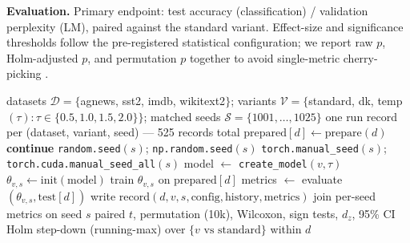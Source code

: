 \documentclass[11pt,a4paper]{article}
\begin{document}
\textbf{Evaluation.} Primary endpoint: test accuracy (classification) / validation perplexity (LM), paired against the standard variant. Effect-size and significance thresholds follow the pre-registered statistical configuration; we report raw $p$, Holm-adjusted $p$, and permutation $p$ together to avoid single-metric cherry-picking \cite{dodge2019}.

\begin{algorithm}[ht]
\caption{Seed-matched paired experimental protocol}
\label{alg:protocol}
\begin{algorithmic}[1]
\Require datasets $\mathcal{D}=\{$agnews, sst2, imdb, wikitext2$\}$; variants $\mathcal{V}=\{$standard, dk, temp$(\tau): \tau \in \{0.5,1.0,1.5,2.0\}\}$; matched seeds $\mathcal{S}=\{1001,\dots,1025\}$
\Ensure one run record per (dataset, variant, seed) --- 525 records total
  \State $\text{prepared}[d] \gets \text{prepare}(d)$ 
\EndFor
{}
   \State \textbf{continue}  \EndIf
  \State \texttt{random.seed}$(s)$; \texttt{np.random.seed}$(s)$ 
  \State \texttt{torch.manual\_seed}$(s)$; \texttt{torch.cuda.manual\_seed\_all}$(s)$
  \State model $\gets$ \texttt{create\_model}$(v,\tau)$ 
  \State $\theta_{v,s} \gets \text{init}(\text{model})$ 
  \State train $\theta_{v,s}$ on $\text{prepared}[d]$ 
  \State metrics $\gets$ evaluate$(\theta_{v,s}, \text{test}[d])$ 
  \State write record$(d,v,s,\text{config},\text{history},\text{metrics})$
\EndFor\EndFor\EndFor
{}
  \State join per-seed metrics on seed $s$ 
  \State paired $t$, permutation (10k), Wilcoxon, sign tests, $d_z$, 95\% CI
  \State Holm step-down (running-max) over $\{v \text{ vs standard}\}$ within $d$
\EndFor
\end{algorithmic}
\end{algorithm}
\end{document}
